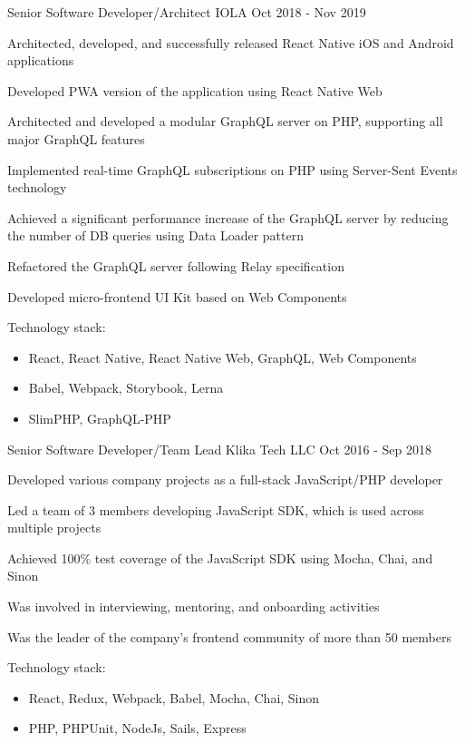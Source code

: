 \begin{cventries}
  \cventry
    {Senior Software Developer/Architect} %
    {IOLA} %
    {} %
    {Oct 2018 - Nov 2019} %
    {
      \begin{cvitems}
        \item Architected, developed, and successfully released React Native iOS and Android applications
        \item Developed PWA version of the application using React Native Web
        \item Architected and developed a modular GraphQL server on PHP, supporting all major GraphQL features
        \item Implemented real-time GraphQL subscriptions on PHP using Server-Sent Events technology
        \item Achieved a significant performance increase of the GraphQL server by reducing the number of DB queries using Data Loader pattern
        \item Refactored the GraphQL server following Relay specification
        \item Developed micro-frontend UI Kit based on Web Components
      \end{cvitems}
      \vspace{5mm}
      Technology stack:
      \begin{itemize}[leftmargin=2ex, nosep, noitemsep]
        \item React, React Native, React Native Web, GraphQL, Web Components
        \item Babel, Webpack, Storybook, Lerna
        \item SlimPHP, GraphQL-PHP
      \end{itemize}
      \vspace{-4.0mm}
    }

  \cventry
    {Senior Software Developer/Team Lead} %
    {Klika Tech LLC} %
    {} %
    {Oct 2016 - Sep 2018} %
    {
      \begin{cvitems}
        \item Developed various company projects as a full-stack JavaScript/PHP developer
        \item Led a team of 3 members developing JavaScript SDK, which is used across multiple projects
        \item Achieved 100\% test coverage of the JavaScript SDK using Mocha, Chai, and Sinon
        \item Was involved in interviewing, mentoring, and onboarding activities
        \item Was the leader of the company's frontend community of more than 50 members
      \end{cvitems}
      \vspace{5mm}
      Technology stack:
      \begin{itemize}[leftmargin=2ex, nosep, noitemsep]
        \item React, Redux, Webpack, Babel, Mocha, Chai, Sinon
        \item PHP, PHPUnit, NodeJs, Sails, Express
      \end{itemize}
      \vspace{-4.0mm}
    }


\end{cventries}
